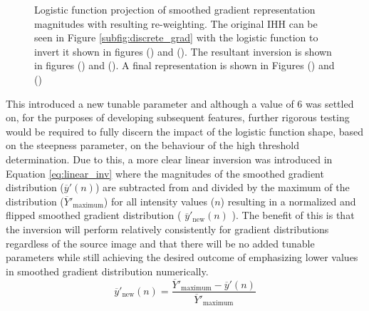 \begin{figure}
    \hfill
    \caption[Logistic function projection of smoothed gradient representation magnitudes with resulting re-weighting]{Logistic function projection of smoothed gradient representation magnitudes with resulting re-weighting. The original IHH can be seen in Figure \ref{subfig:discrete_grad} with the logistic function to invert it shown in figures () and (). The resultant inversion is shown in figures () and (). A final representation is shown in Figures () and ()
    }
    \label{fig:logistic_rescaling}
\end{figure}
This introduced a new tunable parameter and although a value of $6$ was settled on, for the purposes of developing subsequent features, further rigorous testing would be required to fully discern the impact of the logistic function shape, based on the steepness parameter, on the behaviour of the high threshold determination. Due to this, a more clear linear inversion was introduced in Equation \ref{eq:linear_inv} where the magnitudes of the smoothed gradient distribution ($\overline{y}'(n)$) are subtracted from and divided by the maximum of the distribution ($\overline{Y}'_{\text{maximum}}$) for all intensity values ($n$) resulting in a normalized and flipped smoothed gradient distribution ( $\overline{y}'_{\text{new}}(n)$ ). The benefit of this is that the inversion will perform relatively consistently for gradient distributions regardless of the source image and that there will be no added tunable parameters while still achieving the desired outcome of emphasizing lower values in smoothed gradient distribution numerically.
\begin{equation}\label{eq:linear_inv}
    \overline{y}'_{\text{new}}(n) = \frac{\overline{Y}'_{\text{maximum}} - \overline{y}'(n)}{\overline{Y}'_{\text{maximum}}}
\end{equation}

